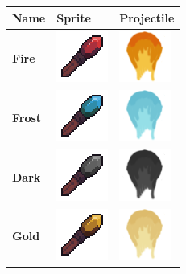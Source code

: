 \documentclass[../Main.tex]{subfiles}
\begin{document}
            \begin{center}
                \begin{tabular}{ | m{} | m{} | m{} | }
                    \hline
                    \textbf{Name} & \textbf{Sprite} & \textbf{Projectile} \\
                    \hline
                    \textbf{Fire} & \centerline{\includegraphics[scale=1]{../res/textures/items/weapons/FireStaff.png}} & \centerline{\includegraphics[scale=3]{../res/textures/projectiles/Fire.png}} \\
                    \hline
                    \textbf{Frost} & \centerline{\includegraphics[scale=1]{../res/textures/items/weapons/FrostStaff.png}} & \centerline{\includegraphics[scale=3]{../res/textures/projectiles/Frost.png}} \\
                    \hline
                    \textbf{Dark} & \centerline{\includegraphics[scale=1]{../res/textures/items/weapons/DarkStaff.png}} & \centerline{\includegraphics[scale=3]{../res/textures/projectiles/Dark.png}} \\
                    \hline
                    \textbf{Gold} & \centerline{\includegraphics[scale=1]{../res/textures/items/weapons/GoldStaff.png}} & \centerline{\includegraphics[scale=3]{../res/textures/projectiles/Gold.png}} \\
                    \hline
                \end{tabular}
            \end{center}
\end{document}
